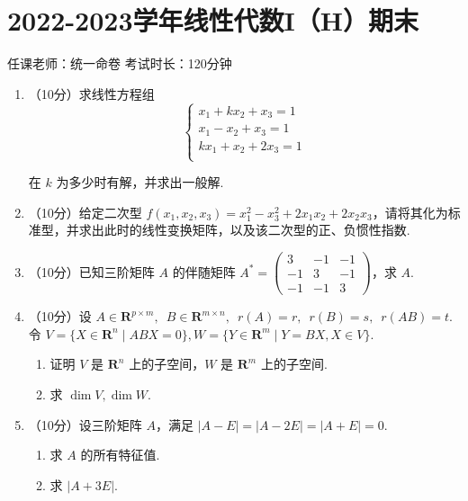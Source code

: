 \section{2022-2023学年线性代数I（H）期末}

\begin{center}
    任课老师：统一命卷\hspace{4em} 考试时长：120分钟
\end{center}

\begin{enumerate}
    \item （10分）求线性方程组
    \[\begin{cases}
      x_1+kx_2+x_3= 1 \\
      x_1-x_2+x_3= 1 \\
      kx_1+x_2+2x_3= 1 \\
    \end{cases}\]

    在 $k$ 为多少时有解，并求出一般解.
    \item （10分）给定二次型 $f(x_1,x_2,x_3)=x_1^2-x_3^2+2x_1x_2+2x_2x_3$，请将其化为标准型，并求出此时的线性变换矩阵，以及该二次型的正、负惯性指数.

    \item （10分）已知三阶矩阵 $A$ 的伴随矩阵 $A^*=\begin{pmatrix}
        3 & -1 &- 1 \\
        -1 & 3 & -1 \\
        -1 & -1 & 3
    \end{pmatrix} $，求 $A$.

    \item （10分）设 $A\in \mathbf R^{p\times m},\enspace B\in \mathbf R^{m\times n},\enspace r(A)=r,\enspace r(B)=s,\enspace r(AB)=t$. 令 $V=\{X\in \mathbf R^n\mid ABX=0\},W=\{Y\in \mathbf R^m\mid Y=BX,X\in V\}$.
    \begin{enumerate}
        \item 证明 $V$ 是 $\mathbf R^n$ 上的子空间，$W$ 是 $\mathbf R^m$ 上的子空间.
        \item 求 $\dim V,\dim W$.
    \end{enumerate}

    \item （10分）设三阶矩阵 $A$，满足 $|A-E|=|A-2E|=|A+E|=0$.
    \begin{enumerate}
        \item 求 $A$ 的所有特征值.
        \item 求 $|A+3E|$.
    \end{enumerate}


\end{enumerate}
